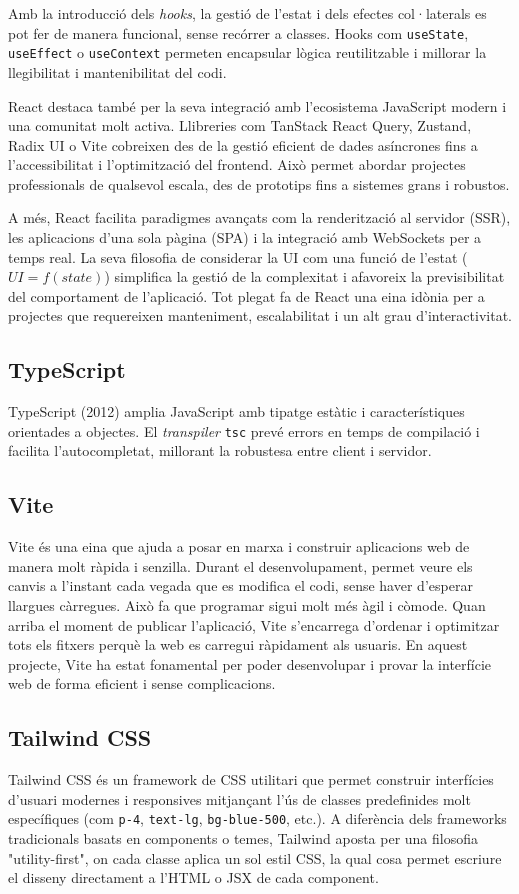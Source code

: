 Amb la introducció dels \emph{hooks}, la gestió de l'estat i dels efectes col·laterals es pot fer de manera funcional, sense recórrer a classes. Hooks com \texttt{useState}, \texttt{useEffect} o \texttt{useContext} permeten encapsular lògica reutilitzable i millorar la llegibilitat i mantenibilitat del codi.

React destaca també per la seva integració amb l'ecosistema JavaScript modern i una comunitat molt activa. Llibreries com TanStack React Query, Zustand, Radix UI o Vite cobreixen des de la gestió eficient de dades asíncrones fins a l'accessibilitat i l'optimització del frontend. Això permet abordar projectes professionals de qualsevol escala, des de prototips fins a sistemes grans i robustos.

A més, React facilita paradigmes avançats com la renderització al servidor (SSR), les aplicacions d'una sola pàgina (SPA) i la integració amb WebSockets per a temps real. La seva filosofia de considerar la UI com una funció de l'estat (\( UI = f(state) \)) simplifica la gestió de la complexitat i afavoreix la previsibilitat del comportament de l'aplicació. Tot plegat fa de React una eina idònia per a projectes que requereixen manteniment, escalabilitat i un alt grau d'interactivitat.


\subsection*{TypeScript}
TypeScript (2012) amplia JavaScript amb tipatge estàtic i característiques orientades a objectes. El \emph{transpiler} \texttt{tsc} prevé errors en temps de compilació i facilita l'autocompletat, millorant la robustesa entre client i servidor.

\subsection*{Vite}
Vite és una eina que ajuda a posar en marxa i construir aplicacions web de manera molt ràpida i senzilla. Durant el desenvolupament, permet veure els canvis a l'instant cada vegada que es modifica el codi, sense haver d'esperar llargues càrregues. Això fa que programar sigui molt més àgil i còmode. Quan arriba el moment de publicar l'aplicació, Vite s'encarrega d'ordenar i optimitzar tots els fitxers perquè la web es carregui ràpidament als usuaris. En aquest projecte, Vite ha estat fonamental per poder desenvolupar i provar la interfície web de forma eficient i sense complicacions.

\subsection*{Tailwind CSS}
Tailwind CSS és un framework de CSS utilitari que permet construir interfícies d'usuari modernes i responsives mitjançant l'ús de classes predefinides molt específiques (com \texttt{p-4}, \texttt{text-lg}, \texttt{bg-blue-500}, etc.). A diferència dels frameworks tradicionals basats en components o temes, Tailwind aposta per una filosofia "utility-first", on cada classe aplica un sol estil CSS, la qual cosa permet escriure el disseny directament a l'HTML o JSX de cada component.

